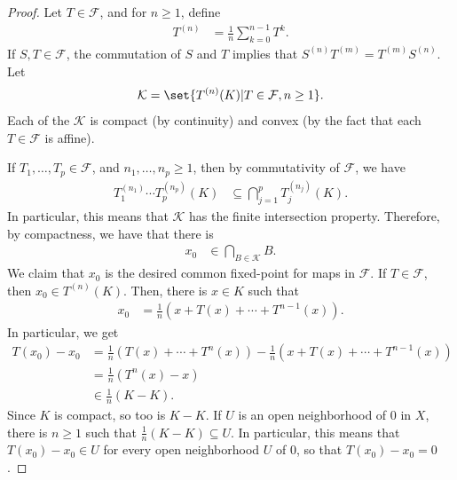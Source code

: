 \documentclass[10pt]{mypackage}
\begin{document}
\begin{proof}
  Let $T\in \mathcal{F}$, and for $n\geq 1$, define
  \begin{align*}
    T^{(n)} &= \frac{1}{n}\sum_{k=0}^{n-1} T^{k}.
  \end{align*}
  If $S,T\in \mathcal{F}$, the commutation of $S$ and $T$ implies that $S^{(n)}T^{(m)} = T^{(m)}S^{(n)}$. Let 
  \begin{align*}
    \mathcal{K} = \set{T^{(n)}(K) | T\in \mathcal{F},n\geq 1}.   
  \end{align*}
   Each of the $ \mathcal{K} $ is compact (by continuity) and convex (by the fact that each $T\in \mathcal{F}$ is affine).

  If $T_1,\dots,T_p\in \mathcal{F}$, and $n_1,\dots,n_p\geq 1$, then by commutativity of $ \mathcal{F} $, we have
  \begin{align*}
    T_1^{\left(n_1\right)}\cdots T_p^{\left( n_p \right)}\left( K \right) &\subseteq \bigcap_{j=1}^{p} T_j^{\left( n_j \right)}\left( K \right).
  \end{align*}
  In particular, this means that $\mathcal{K}$ has the finite intersection property. Therefore, by compactness, we have that there is
  \begin{align*}
    x_0 &\in \bigcap_{B\in \mathcal{K}} B.
  \end{align*}
  We claim that $x_0$ is the desired common fixed-point for maps in $\mathcal{F}$. If $T\in \mathcal{F}$, then $x_0\in T^{(n)}\left( K \right)$. Then, there is $x\in K$ such that
  \begin{align*}
    x_0 &= \frac{1}{n}\left( x + T(x) + \cdots + T^{n-1}(x) \right).
  \end{align*}
  In particular, we get
  \begin{align*}
    T\left( x_0 \right) - x_0 &= \frac{1}{n}\left( T(x) + \cdots + T^{n}(x) \right) - \frac{1}{n}\left( x + T(x) + \cdots + T^{n-1}(x) \right)\\
                              &= \frac{1}{n}\left( T^n(x)-x \right)\\
                              &\in \frac{1}{n} \left( K-K \right).
  \end{align*}
  Since $K$ is compact, so too is $K-K$. If $U$ is an open neighborhood of $0$ in $X$, there is $n\geq 1$ such that $\frac{1}{n}\left( K-K \right) \subseteq U$. In particular, this means that $T\left(x_0\right) - x_0\in U$ for every open neighborhood $U$ of $0$, so that $T\left( x_0 \right) - x_0 = 0$.
\end{proof}
\end{document}
